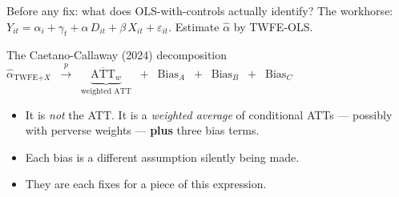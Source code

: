 \documentclass[aspectratio=169,11pt]{beamer}
\begin{document}



\begin{frame}{Before any fix: what does OLS-with-controls actually identify?}
\vspace{0.4em}
The workhorse: $Y_{it} = \alpha_i + \gamma_t + \alpha\, D_{it} + \beta\, X_{it} + \varepsilon_{it}$. Estimate $\widehat\alpha$ by TWFE-OLS.
\vspace{0.5em}
\begin{block}{The Caetano-Callaway (2024) decomposition}
\vspace{-0.2em}
\centering
$\widehat{\alpha}_{\text{TWFE+}X} \;\;\xrightarrow{p}\;\; \underbrace{\overline{\text{ATT}}_w}_{\text{weighted ATT}} \;\;+\;\; \mathrm{Bias}_A \;\;+\;\; \mathrm{Bias}_B \;\;+\;\; \mathrm{Bias}_C$
\end{block}
\vspace{0.5em}
\begin{itemize}\small
  \item It is \textit{not} the ATT.\;\; It is a \textit{weighted average} of conditional ATTs --- possibly with perverse weights --- \textbf{plus} three bias terms.
  \item Each bias is a different assumption silently being made.
  \item {} They are each fixes for a piece of this expression.
\end{itemize}
\end{frame}
\end{document}
